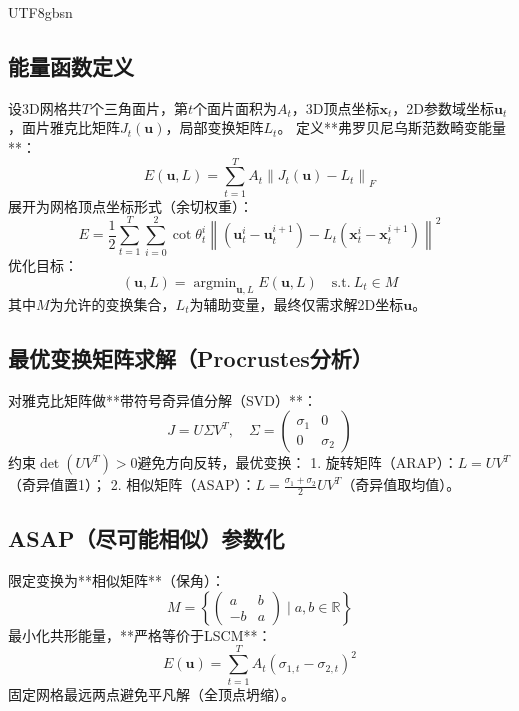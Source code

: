 \documentclass[10pt,a4paper,twocolumn]{article}
\newcommand{\fro}[1]{\left\|#1\right\|_F}
\newcommand{\argmin}{\mathop{\mathrm{argmin}}}
\newcommand{\R}{\mathbb{R}}
\begin{document}
\begin{CJK*}{UTF8}{gbsn}
\subsection{能量函数定义}
设3D网格共$T$个三角面片，第$t$个面片面积为$A_t$，3D顶点坐标$\boldsymbol{x}_t$，2D参数域坐标$\boldsymbol{u}_t$，面片雅克比矩阵$J_t(\boldsymbol{u})$，局部变换矩阵$L_t$。
定义**弗罗贝尼乌斯范数畸变能量**：
\begin{equation}
E(\boldsymbol{u}, L)=\sum_{t=1}^{T} A_t \fro{J_t(\boldsymbol{u}) - L_t}
\end{equation}
展开为网格顶点坐标形式（余切权重）：
\begin{equation}
E = \frac{1}{2}\sum_{t=1}^T\sum_{i=0}^2 \cot\theta_t^i \left\| (\boldsymbol{u}_t^i-\boldsymbol{u}_t^{i+1}) - L_t(\boldsymbol{x}_t^i-\boldsymbol{x}_t^{i+1}) \right\|^2
\end{equation}
优化目标：
\begin{equation}
(\boldsymbol{u}, L) = \argmin_{\boldsymbol{u},L} E(\boldsymbol{u},L) \quad \text{s.t.} \ L_t \in M
\end{equation}
其中$M$为允许的变换集合，$L_t$为辅助变量，最终仅需求解2D坐标$\boldsymbol{u}$。

\subsection{最优变换矩阵求解（Procrustes分析）}
对雅克比矩阵做**带符号奇异值分解（SVD）**：
$$ J = U\Sigma V^T, \quad \Sigma=\begin{pmatrix}\sigma_1&0\\0&\sigma_2\end{pmatrix} $$
约束$\det(UV^T)>0$避免方向反转，最优变换：
1. 旋转矩阵（ARAP）：$L=UV^T$（奇异值置1）；
2. 相似矩阵（ASAP）：$L=\frac{\sigma_1+\sigma_2}{2}UV^T$（奇异值取均值）。

\subsection{ASAP（尽可能相似）参数化}
限定变换为**相似矩阵**（保角）：
$$ M=\left\{ \begin{pmatrix}a&b\\-b&a\end{pmatrix} \mid a,b\in\R \right\} $$
最小化共形能量，**严格等价于LSCM**：
\begin{equation}
E(\boldsymbol{u}) = \sum_{t=1}^T A_t (\sigma_{1,t}-\sigma_{2,t})^2
\end{equation}
固定网格最远两点避免平凡解（全顶点坍缩）。


\end{CJK*}
\end{document}
